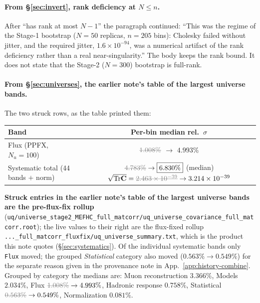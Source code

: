 \paragraph{From \S\ref{sec:invert}, rank deficiency at $N\le n$.} After ``has rank at most $N-1$'' the paragraph continued: ``This was the regime of the Stage-1 bootstrap ($N=50$ replicas, $n=205$ bins): Cholesky failed without jitter, and the required jitter, $1.6\times10^{-94}$, was a numerical artifact of the rank deficiency rather than a real near-singularity.'' The body keeps the rank bound. It does not state that the Stage-2 ($N=300$) bootstrap is full-rank.

\paragraph{From \S\ref{sec:universes}, the earlier note's table of the largest universe bands.} The two struck rows, as the table printed them:
\begin{center}
\begin{tabular}{@{}lc@{}}
\toprule
Band & Per-bin median rel.\ $\sigma$ \\
\midrule
Flux (PPFX, $N_{u}=100$) & $\dead{1.008\%}$ $\to$ $4.993\%$ \\
\midrule
\shortstack[l]{Systematic total\\(44 bands $+$ norm)} & \shortstack[l]{$\dead{4.783\%} \to \boxed{6.830\%}$ (median)\\$\sqrt{\Tr\mathbf{C}}=\dead{2.463\times10^{-39}} \to 3.214\times10^{-39}$} \\
\bottomrule
\end{tabular}
\end{center}
\textbf{Struck entries in the earlier note's table of the largest universe bands are the pre-flux-fix rollup} (\texttt{uq/universe\_stage2\_MEFHC\_full\_matcorr/uq\_universe\_covariance\_full\_matcorr.root}); the live values to their right are the flux-fixed rollup \texttt{...\_full\_matcorr\_fluxfix/uq\_universe\_summary.txt}, which is the product this note quotes (\S\ref{sec:systematics}). Of the individual systematic bands only \texttt{Flux} moved; the grouped \emph{Statistical} category also moved ($0.563\% \to 0.549\%$) for the separate reason given in the provenance note in App.~\ref{app:history-combine}. Grouped by category the medians are: Muon reconstruction $3.366\%$, Models $2.034\%$, Flux $\dead{1.008\%} \to 4.993\%$, Hadronic response $0.758\%$, Statistical $\dead{0.563\%} \to 0.549\%$, Normalization $0.081\%$.

